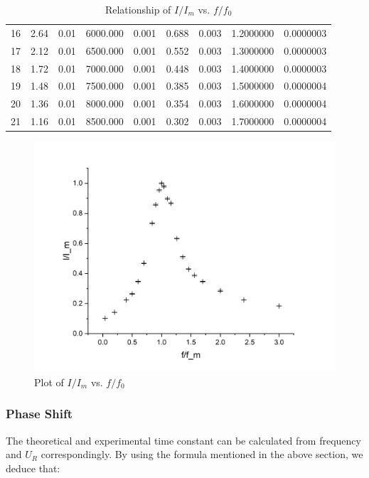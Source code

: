 \documentclass[a4paper]{article}
\begin{document}
\begin{table}[htbp]
\begin{tabular}{ccccccccc}
		16 & 2.64        & 0.01            & 6000.000 & 0.001      & 0.688   & 0.003       & 1.2000000 & 0.0000003   \\
		17 & 2.12        & 0.01            & 6500.000 & 0.001      & 0.552   & 0.003       & 1.3000000 & 0.0000003   \\
		18 & 1.72        & 0.01            & 7000.000 & 0.001      & 0.448   & 0.003       & 1.4000000 & 0.0000003   \\
		19 & 1.48        & 0.01            & 7500.000 & 0.001      & 0.385   & 0.003       & 1.5000000 & 0.0000004   \\
		20 & 1.36        & 0.01            & 8000.000 & 0.001      & 0.354   & 0.003       & 1.6000000 & 0.0000004   \\
		21 & 1.16        & 0.01            & 8500.000 & 0.001      & 0.302   & 0.003       & 1.7000000 & 0.0000004   \\
		\hline
	\end{tabular}
	\caption{Relationship of $I/I_m$ vs. $f/f_0$}
\end{table}


\begin{figure}[H]
	\center
	\includegraphics[width=12cm]{F_I.jpg}
	\caption{Plot of $I/I_m$ vs. $f/f_0$}
\end{figure}


\subsubsection{Phase Shift}
The theoretical and experimental time constant can be calculated from frequency and $U_R$ correspondingly. By using the formula mentioned in the above section, we deduce that:
\end{document}
